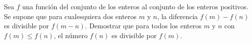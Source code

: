 Sea $f$ una función del conjunto de los enteros al conjunto de los enteros positivos. Se supone que para cualesquiera dos enteros $m$ y $n$, la diferencia $f (m) − f (n)$ es divisible por $f (m − n).$ Demostrar que para todos los enteros $m$ y $n$ con $f(m) \leq f(n)$, el número $f(n)$ es divisible por $f(m)$.
